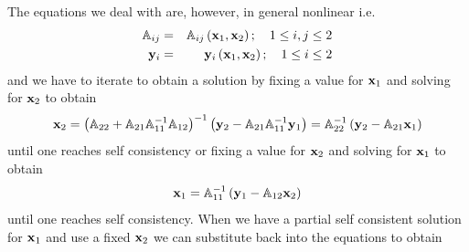The equations we deal with are, however, in general nonlinear i.e. 
\begin{eqnarray}
{\Bbb A}_{ij} &=&{\Bbb A}_{ij}\left( {\bf x}_{1},{\bf x}_{2}\right) ;\quad
1\leq i,j\leq 2  \nonumber \\
{\bf y}_{i} &=&{\bf y}_{i}\left( {\bf x}_{1},{\bf x}_{2}\right) ;\quad 1\leq
i\leq 2
\end{eqnarray}%
and we have to iterate to obtain a solution by fixing a value for ${\bf x}%
_{1}$ and solving for ${\bf x}_{2\text{ }}$to obtain 
\begin{equation}
{\bf x}_{2}=\left( {\Bbb A}_{22}+{\Bbb A}_{21}{\Bbb A}_{11}^{-1}{\Bbb A}%
_{12}\right) ^{-1}\left( {\bf y}_{2}-{\Bbb A}_{21}{\Bbb A}_{11}^{-1}{\bf y}%
_{1}\right) ={\Bbb A}_{22}^{-1}\left( {\bf y}_{2}-{\Bbb A}_{21}{\bf x}%
_{1}\right)  \label{x2parteq}
\end{equation}%
until one reaches self consistency or fixing a value for ${\bf x}_{2}$ and
solving for ${\bf x}_{1\text{ }}$to obtain%
\begin{equation}
{\bf x}_{1}={\Bbb A}_{11}^{-1}\left( {\bf y}_{1}-{\Bbb A}_{12}{\bf x}%
_{2}\right)  \label{x1parteq}
\end{equation}%
until one reaches self consistency. When we have a partial self consistent
solution for ${\bf x}_{1}$ and use a fixed ${\bf x}_{2}$ we can substitute
back into the equations to obtain 

